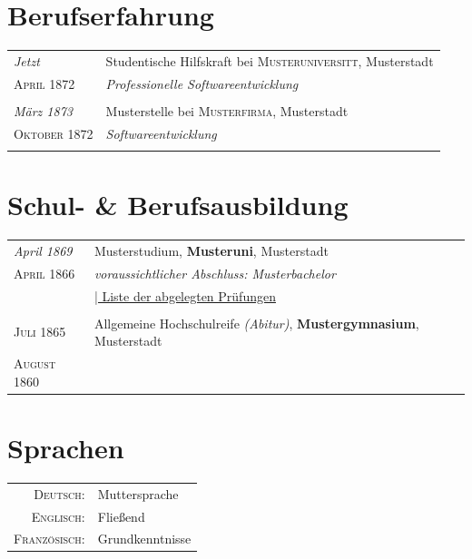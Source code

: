 \documentclass[a4paper,10pt]{article}
\begin{document}
\section{Berufserfahrung}
\begin{tabular}{p{2.5cm}|p{11cm}}
  \emph{Jetzt} & Studentische Hilfskraft bei \textsc{Musteruniversit\"t}, Musterstadt \\
  \textsc{April 1872}&\emph{Professionelle Softwareentwicklung}\\
  &\footnotesize{}\\

  \emph{M\"arz 1873} & Musterstelle bei \textsc{Musterfirma}, Musterstadt \\
  \textsc{Oktober 1872}&\emph{Softwareentwicklung}\\
  &\footnotesize{}\\

\end{tabular}



\section{Schul- \& Berufsausbildung}
\begin{tabular}{p{2.5cm}|p{11cm}}	
  \emph{April 1869}&  Musterstudium, \textbf{Musteruni}, Musterstadt\\
  \textsc{April} 1866& \small\emph{voraussichtlicher Abschluss: Musterbachelor} \\
  &\normalsize \hyperlink{grds}{\hfill | \footnotesize Liste der abgelegten Pr\"ufungen}\\&\\

   \textsc{Juli} 1865 & Allgemeine Hochschulreife \textit{(Abitur)}, \textbf{Mustergymnasium}, Musterstadt\\
  \textsc{August 1860}
\end{tabular}


\section{Sprachen}
\begin{tabular}{rl}
 \textsc{Deutsch:}& Muttersprache\\
\textsc{Englisch:}& Flie{\ss}end\\
\textsc{Franz\"osisch:}& Grundkenntnisse\\
\end{tabular}
\end{document}
